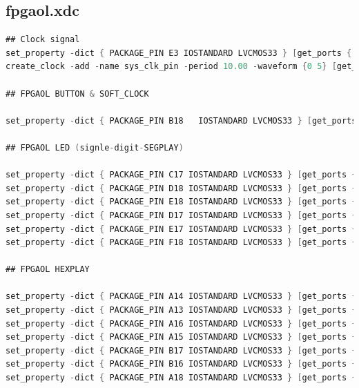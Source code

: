 \documentclass{ctexart}
\begin{document}
\subsection{fpgaol.xdc}
\begin{lstlisting}[language=Verilog]
## Clock signal
set_property -dict { PACKAGE_PIN E3 IOSTANDARD LVCMOS33 } [get_ports { CLK100MHZ }];
create_clock -add -name sys_clk_pin -period 10.00 -waveform {0 5} [get_ports { CLK100MHZ }];

## FPGAOL BUTTON & SOFT_CLOCK

set_property -dict { PACKAGE_PIN B18   IOSTANDARD LVCMOS33 } [get_ports { reset }];

## FPGAOL LED (signle-digit-SEGPLAY)

set_property -dict { PACKAGE_PIN C17 IOSTANDARD LVCMOS33 } [get_ports { ryg_side[0] }];
set_property -dict { PACKAGE_PIN D18 IOSTANDARD LVCMOS33 } [get_ports { ryg_side[1] }];
set_property -dict { PACKAGE_PIN E18 IOSTANDARD LVCMOS33 } [get_ports { ryg_side[2] }];
set_property -dict { PACKAGE_PIN D17 IOSTANDARD LVCMOS33 } [get_ports { ryg_main[0] }];
set_property -dict { PACKAGE_PIN E17 IOSTANDARD LVCMOS33 } [get_ports { ryg_main[1] }];
set_property -dict { PACKAGE_PIN F18 IOSTANDARD LVCMOS33 } [get_ports { ryg_main[2] }];

## FPGAOL HEXPLAY

set_property -dict { PACKAGE_PIN A14 IOSTANDARD LVCMOS33 } [get_ports { hexplay_data[0] }];
set_property -dict { PACKAGE_PIN A13 IOSTANDARD LVCMOS33 } [get_ports { hexplay_data[1] }];
set_property -dict { PACKAGE_PIN A16 IOSTANDARD LVCMOS33 } [get_ports { hexplay_data[2] }];
set_property -dict { PACKAGE_PIN A15 IOSTANDARD LVCMOS33 } [get_ports { hexplay_data[3] }];
set_property -dict { PACKAGE_PIN B17 IOSTANDARD LVCMOS33 } [get_ports { hexplay_an[0] }];
set_property -dict { PACKAGE_PIN B16 IOSTANDARD LVCMOS33 } [get_ports { hexplay_an[1] }];
set_property -dict { PACKAGE_PIN A18 IOSTANDARD LVCMOS33 } [get_ports { hexplay_an[2] }];
\end{lstlisting}
\end{document}
